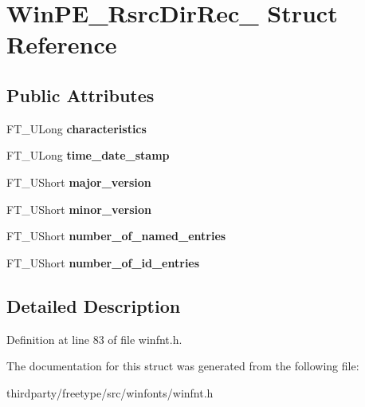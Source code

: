 \hypertarget{struct_win_p_e___rsrc_dir_rec__}{}\section{Win\+P\+E\+\_\+\+Rsrc\+Dir\+Rec\+\_\+ Struct Reference}
\label{struct_win_p_e___rsrc_dir_rec__}
\subsection*{Public Attributes}
\begin{DoxyCompactItemize}
\item 
\mbox{\label{struct_win_p_e___rsrc_dir_rec___a23f7f2977c1c34c4317741f4fcd6a58a}} 
F\+T\+\_\+\+U\+Long {\bfseries characteristics}
\item 
\mbox{\label{struct_win_p_e___rsrc_dir_rec___a14ef2553ea9390f8643f01b2529e1fdf}} 
F\+T\+\_\+\+U\+Long {\bfseries time\+\_\+date\+\_\+stamp}
\item 
\mbox{\label{struct_win_p_e___rsrc_dir_rec___adfa2f31408fb3f9f3eb1db4de765c2d1}} 
F\+T\+\_\+\+U\+Short {\bfseries major\+\_\+version}
\item 
\mbox{\label{struct_win_p_e___rsrc_dir_rec___a22f220128c743a4802466b4de4bca989}} 
F\+T\+\_\+\+U\+Short {\bfseries minor\+\_\+version}
\item 
\mbox{\label{struct_win_p_e___rsrc_dir_rec___aaa067a8543e2eba18daedff82c2f05cb}} 
F\+T\+\_\+\+U\+Short {\bfseries number\+\_\+of\+\_\+named\+\_\+entries}
\item 
\mbox{\label{struct_win_p_e___rsrc_dir_rec___a4b13483a39573f4bfdff00407c9212b1}} 
F\+T\+\_\+\+U\+Short {\bfseries number\+\_\+of\+\_\+id\+\_\+entries}
\end{DoxyCompactItemize}


\subsection{Detailed Description}


Definition at line 83 of file winfnt.\+h.



The documentation for this struct was generated from the following file\+:\begin{DoxyCompactItemize}
\item 
thirdparty/freetype/src/winfonts/winfnt.\+h\end{DoxyCompactItemize}
